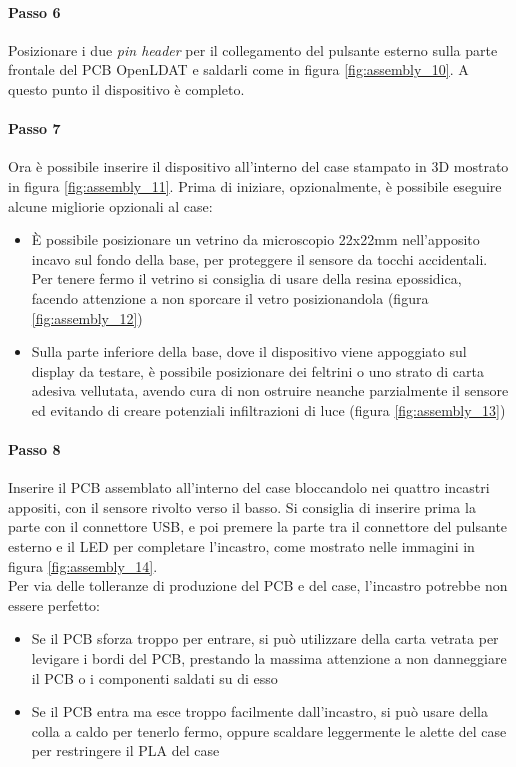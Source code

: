\paragraph{Passo 6} Posizionare i due \textit{pin header} per il collegamento del pulsante esterno sulla parte frontale del PCB OpenLDAT e saldarli come in figura \ref{fig:assembly_10}. A questo punto il dispositivo è completo.

\paragraph{Passo 7} Ora è possibile inserire il dispositivo all'interno del case stampato in 3D mostrato in figura \ref{fig:assembly_11}. Prima di iniziare, opzionalmente, è possibile eseguire alcune migliorie opzionali al case:
\begin{itemize}
	\item È possibile posizionare un vetrino da microscopio 22x22mm nell'apposito incavo sul fondo della base, per proteggere il sensore da tocchi accidentali. Per tenere fermo il vetrino si consiglia di usare della resina epossidica, facendo attenzione a non sporcare il vetro posizionandola (figura \ref{fig:assembly_12})
	\item Sulla parte inferiore della base, dove il dispositivo viene appoggiato sul display da testare, è possibile posizionare dei feltrini o uno strato di carta adesiva vellutata, avendo cura di non ostruire neanche parzialmente il sensore ed evitando di creare potenziali infiltrazioni di luce (figura \ref{fig:assembly_13})
\end{itemize}

\paragraph{Passo 8} Inserire il PCB assemblato all'interno del case bloccandolo nei quattro incastri appositi, con il sensore rivolto verso il basso. Si consiglia di inserire prima la parte con il connettore USB, e poi premere la parte tra il connettore del pulsante esterno e il LED per completare l'incastro, come mostrato nelle immagini in figura \ref{fig:assembly_14}.\\
Per via delle tolleranze di produzione del PCB e del case, l'incastro potrebbe non essere perfetto:\begin{itemize}
	\item Se il PCB sforza troppo per entrare, si può utilizzare della carta vetrata per levigare i bordi del PCB, prestando la massima attenzione a non danneggiare il PCB o i componenti saldati su di esso
	\item Se il PCB entra ma esce troppo facilmente dall'incastro, si può usare della colla a caldo per tenerlo fermo, oppure scaldare leggermente le alette del case per restringere il PLA del case
\end{itemize}

